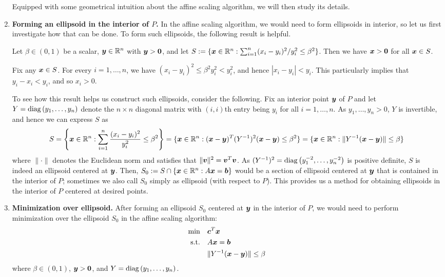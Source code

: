 \begin{enumerate}
Equipped with some geometrical intuition about the affine scaling algorithm, we
will then study its details.
\item \textbf{Forming an ellipsoid in the interior of \(P\).} In the affine
scaling algorithm, we would need to form ellipsoids in interior, so let us
first investigate how that can be done. To form such ellipsoids, the following
result is helpful.
\begin{lemma}
\label{lma:form-ellip-interior}
Let \(\beta\in (0,1)\) be a scalar, \(\bm{y}\in\mathbb{R}^{n}\) with \(\bm{y}>\bm{0}\),
and let \(S:=\{\bm{x}\in\mathbb{R}^{n}:\sum_{i=1}^{n}(x_i-y_i)^{2}/y_i^{2}\le\beta^{2}\}\).
Then we have \(\bm{x}>\bm{0}\) for all \(\bm{x}\in S\).
\end{lemma}
\begin{pf}
Fix any \(\bm{x}\in S\). For every \(i=1,\dotsc,n\), we have \((x_i-y_i)^{2}\le\beta^{2}y_i^{2}
<y_i^{2}\), and hence \(|x_i-y_i|<y_i\). This particularly implies that \(y_i-x_i<y_i\),
and so \(x_i>0\).
\end{pf}

To see how this result helps us construct such ellipsoids, consider the
following.  Fix an interior point \(\bm{y}\) of \(P\) and let
\(Y=\operatorname{diag}\left(y_1,\dotsc,y_n\right)\) denote the \(n\times n\) diagonal matrix with
\((i,i)\)th entry being \(y_i\) for all \(i=1,\dotsc,n\). As
\(y_1,\dotsc,y_n>0\), \(Y\) is invertible, and hence we can express \(S\) as
\[
S=\left\{\bm{x}\in\mathbb{R}^{n}:\sum_{i=1}^{n}\frac{(x_i-y_i)^{2}}{y_i^{2}}\le\beta^{2}\right\}
=\{\bm{x}\in\mathbb{R}^{n}:(\bm{x}-\bm{y})^{T}(Y^{-1})^{2}(\bm{x}-\bm{y})\le\beta^{2}\}
=\{\bm{x}\in\mathbb{R}^{n}:\|Y^{-1}(\bm{x}-\bm{y})\|\le\beta\}
\]
where \(\|\cdot\|\) denotes the Euclidean norm and satisfies that
\(\|\bm{v}\|^{2}=\bm{v}^{T}\bm{v}\).  As
\((Y^{-1})^{2}=\operatorname{diag}\left(y_1^{-2},\dotsc,y_n^{-2}\right)\) is positive definite, \(S\) is
indeed an ellipsoid centered at \(\bm{y}\). Then, \(S_0:=S\cap
\{\bm{x}\in\mathbb{R}^{n}:A\bm{x}=\bm{b}\}\) would be a section of ellipsoid
centered at \(\bm{y}\) that is contained in the interior of \(P\); sometimes we also
call \(S_0\) simply as ellipsoid (with respect to \(P\)). This provides us a
method for obtaining ellipsoids in the interior of \(P\) centered at desired
points.
\item\label{it:min-over-ellip} \textbf{Minimization over ellipsoid.} After forming an ellipsoid \(S_0\)
centered at \(\bm{y}\) in the interior of \(P\), we would need to perform
minimization over the ellipsoid \(S_0\) in the affine scaling algorithm:
\begin{align*}
\text{min}\quad&\bm{c}^{T}\bm{x} \\
\text{s.t.}\quad&A\bm{x}=\bm{b} \\
&\|Y^{-1}(\bm{x}-\bm{y})\|\le\beta
\end{align*}
where \(\beta\in (0,1)\), \(\bm{y}>\bm{0}\), and \(Y=\operatorname{diag}\left(y_1,\dotsc,y_n\right)\).


\end{enumerate}
